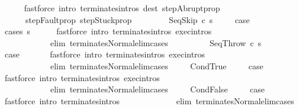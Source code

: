 \begin{isabellebody}
\ \ \ \ \isamarkupfalse%
\ {\isacharparenleft}fastforce\ intro{\isacharcolon}\ terminates{\isachardot}intros\ dest{\isacharcolon}\ step{\isacharunderscore}Abrupt{\isacharunderscore}prop\ \isanewline
\ \ \ \ \ \ step{\isacharunderscore}Fault{\isacharunderscore}prop\ step{\isacharunderscore}Stuck{\isacharunderscore}prop{\isacharparenright}{\isacharplus}\isanewline
\ \ \ \ \isamarkupfalse%
\isanewline
{}\isamarkupfalse%
\isanewline
\ \ \isamarkupfalse%
\ {\isacharparenleft}SeqSkip\ c\ s{\isacharparenright}\ \isanewline
\ \ \isamarkupfalse%
\ {\isacharquery}case\ \isanewline
\ \ \ \ \isamarkupfalse%
\ {\isacharparenleft}cases\ s{\isacharparenright}\isanewline
\ \ \ \ \isamarkupfalse%
\ {\isacharparenleft}fastforce\ intro{\isacharcolon}\ terminates{\isachardot}intros\ exec{\isachardot}intros\isanewline
\ \ \ \ \ \ \ \ \ \ \ \ elim{\isacharcolon}\ terminates{\isacharunderscore}Normal{\isacharunderscore}elim{\isacharunderscore}cases\ {\isacharparenright}{\isacharplus}\isanewline
\ \ \ \ \isamarkupfalse%
\isanewline
{}\isamarkupfalse%
\isanewline
\ \ \isamarkupfalse%
\ {\isacharparenleft}SeqThrow\ c\ s{\isacharparenright}\ \isanewline
\ \ \isamarkupfalse%
\ {\isacharquery}case\ \isanewline
\ \ \ \ \isamarkupfalse%
\ {\isacharparenleft}fastforce\ intro{\isacharcolon}\ terminates{\isachardot}intros\ exec{\isachardot}intros\isanewline
\ \ \ \ \ \ \ \ \ \ \ \ elim{\isacharcolon}\ terminates{\isacharunderscore}Normal{\isacharunderscore}elim{\isacharunderscore}cases\ {\isacharparenright}\isanewline
{}\isamarkupfalse%
\isanewline
\ \ \isamarkupfalse%
\ CondTrue\ \isanewline
\ \ \isamarkupfalse%
\ {\isacharquery}case\ \isanewline
\ \ \ \ \isamarkupfalse%
\ {\isacharparenleft}fastforce\ intro{\isacharcolon}\ terminates{\isachardot}intros\ exec{\isachardot}intros\isanewline
\ \ \ \ \ \ \ \ \ \ \ \ elim{\isacharcolon}\ terminates{\isacharunderscore}Normal{\isacharunderscore}elim{\isacharunderscore}cases\ {\isacharparenright}\isanewline
{}\isamarkupfalse%
\isanewline
\ \ \isamarkupfalse%
\ CondFalse\ \isanewline
\ \ \isamarkupfalse%
\ {\isacharquery}case\ \isanewline
\ \ \ \ \isamarkupfalse%
\ {\isacharparenleft}fastforce\ intro{\isacharcolon}\ terminates{\isachardot}intros\ \isanewline
\ \ \ \ \ \ \ \ \ \ \ \ elim{\isacharcolon}\ terminates{\isacharunderscore}Normal{\isacharunderscore}elim{\isacharunderscore}cases\ {\isacharparenright}\isanewline

\end{isabellebody}
